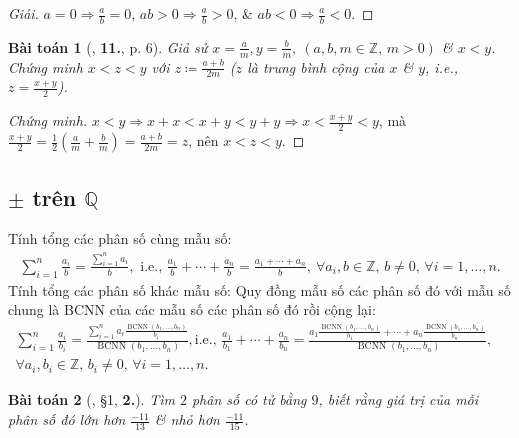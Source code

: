 \documentclass{article}
\numberwithin{equation}{section}
\newtheorem{baitoan}{Bài toán}[section]
\begin{document}
\begin{proof}[Giải]
	$a = 0\Rightarrow\frac{a}{b} = 0$, $ab > 0\Rightarrow\frac{a}{b} > 0$, \& $ab < 0\Rightarrow\frac{a}{b} < 0$.
\end{proof}

\begin{baitoan}[\cite{Trong_Toan_7_2022}, \textbf{11.}, p. 6]
	Giả sử $x = \frac{a}{m},y = \frac{b}{m},\ (a,b,m\in\mathbb{Z},\,m > 0)$ \& $x < y$. Chứng minh $x < z < y$ với $z\coloneqq\frac{a + b}{2m}$ ($z$ là \emph{trung bình cộng} của $x$ \& $y$, i.e., $z = \frac{x + y}{2}$).
\end{baitoan}

\begin{proof}[Chứng minh]
	$x < y\Rightarrow x + x < x + y < y + y\Rightarrow x < \frac{x + y}{2} < y$, mà $\frac{x + y}{2} = \frac{1}{2}\left(\frac{a}{m} + \frac{b}{m}\right) = \frac{a + b}{2m} = z$, nên $x < z < y$.
\end{proof}


\subsection{$\pm$ trên $\mathbb{Q}$}
Tính tổng các phân số cùng mẫu số:
\begin{align*}
	\sum_{i=1}^{n} \frac{a_i}{b} = \frac{\sum_{i=1}^n a_i}{b},\mbox{ i.e., } \frac{a_1}{b} + \cdots + \frac{a_n}{b} = \frac{a_1 + \cdots + a_n}{b},\ \forall a_i,b\in\mathbb{Z},\,b\ne 0,\,\forall i = 1,\ldots,n.
\end{align*}
Tính tổng các phân số khác mẫu số: Quy đồng mẫu số các phân số đó với mẫu số chung là BCNN của các mẫu số các phân số đó rồi cộng lại:
\begin{align*}
	\sum_{i=1}^{n} \frac{a_i}{b_i} = \frac{\sum_{i=1}^n a_i\frac{\operatorname{BCNN}(b_1,\ldots,b_n)}{b_i}}{\operatorname{BCNN}(b_1,\ldots,b_n)},\mbox{i.e., }\frac{a_1}{b_1} + \cdots + \frac{a_n}{b_n} = \frac{a_1\frac{\operatorname{BCNN}(b_1,\ldots,b_n)}{b_1} + \cdots + a_n\frac{\operatorname{BCNN}(b_1,\ldots,b_n)}{b_n}}{\operatorname{BCNN}(b_1,\ldots,b_n)},&\\\forall a_i,b_i\in\mathbb{Z},\,b_i\ne 0,\,\forall i = 1,\ldots,n.&
\end{align*}

\begin{baitoan}[\cite{Binh_Toan_7_tap_1}, \S1, \textbf{2.}]
	Tìm $2$ phân số có tử bằng $9$, biết rằng giá trị của mỗi phân số đó lớn hơn $\frac{-11}{13}$ \& nhỏ hơn $\frac{-11}{15}$.
\end{baitoan}
\end{document}
